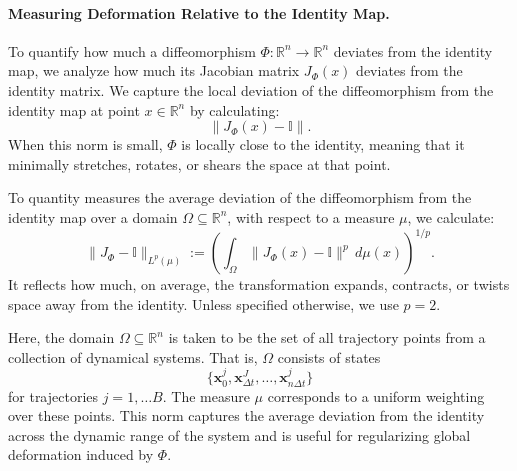 \documentclass{article}
\theoremstyle{definition} \newtheorem{definition}{Definition}  \newtheorem{example}{Example}
\theoremstyle{remark} \newtheorem{remark}{Remark}
\newcounter{ct}
\begin{document}
\paragraph{Measuring Deformation Relative to the Identity Map.}
To quantify how much a diffeomorphism \( \Phi: \mathbb{R}^n \to \mathbb{R}^n \) deviates from the identity map, we analyze how much its Jacobian matrix \( J_{\Phi}(x) \) deviates from the identity matrix.
We capture the local deviation of the diffeomorphism from the identity map at point \( x \in \mathbb{R}^n \) by calculating:
\[
\|J_{\Phi}(x) - \mathbb{I}\|.
\]
When this norm is small, \( \Phi \) is locally close to the identity, meaning that it minimally stretches, rotates, or shears the space at that point.

To quantity measures the average deviation of the diffeomorphism from the identity map over a domain \( \Omega \subseteq \mathbb{R}^n \), with respect to a measure \( \mu \), we calculate: 
\[
\|J_{\Phi} - \mathbb{I}\|_{L^p(\mu)} := \left( \int_{\Omega} \|J_{\Phi}(x) - \mathbb{I}\|^p \, d\mu(x) \right)^{1/p}.
\]
 It reflects how much, on average, the transformation expands, contracts, or twists space away from the identity. 
 Unless specified otherwise, we use $p=2$.

Here, the domain \( \Omega \subseteq \mathbb{R}^n \) is taken to be the set of all trajectory points from a collection of dynamical systems. That is, \( \Omega \) consists of states 
\[
\{ \mathbf{x}_0^j, \mathbf{x}_{\Delta t}^J, \ldots, \mathbf{x}_{n \Delta t}^j \}
\]
for trajectories $j=1, \dots B$.
The measure \( \mu \)  corresponds to a uniform weighting over these points.
This norm captures the average deviation from the identity across the dynamic range of the system and is useful for regularizing global deformation induced by \( \Phi \).



%
%
%
%
%
%
\end{document}
